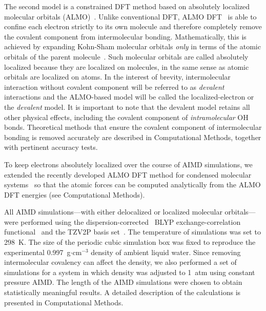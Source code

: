 \documentclass[journal=jacsat,manuscript=article]{achemso}
\begin{document}
The second model is a constrained DFT method based on absolutely localized molecular orbitals (ALMO)~\cite{khaliullin2006efficient}. 
Unlike conventional DFT, ALMO DFT~\cite{Khaliullin2013JCTC} is able to confine each electron strictly to its own molecule and therefore completely remove the covalent component from intermolecular bonding. 
Mathematically, this is achieved by expanding Kohn-Sham molecular orbitals \emph{only} in terms of the atomic orbitals of the parent molecule~\cite{stoll1980use,khaliullin2006efficient, mo2000energy}.
Such molecular orbitals are called absolutely localized because they are localized on molecules, in the same sense as atomic orbitals are localized on atoms. 
In the interest of brevity, intermolecular interaction without covalent component will be referred to as \emph{devalent} interactions and the ALMO-based model will be called the localized-electron or the \emph{devalent} model. 
It is important to note that the devalent model retains all other physical effects, including the covalent component of \emph{intramolecular} OH bonds. %
Theoretical methods that ensure the covalent component of intermolecular bonding is removed accurately are described in Computational Methods, together with pertinent accuracy tests.

To keep electrons absolutely localized over the course of AIMD simulations, we extended the recently developed ALMO DFT method for condensed molecular systems~\cite{Khaliullin2013JCTC} so that the atomic forces can be computed analytically from the ALMO DFT energies (see Computational Methods).

All AIMD simulations---with either delocalized or localized molecular orbitals---were performed using the dispersion-corrected~\cite{grimme2010consistent} BLYP exchange-correlation functional~\cite{becke1988density, lee1988development} and the TZV2P basis set~\cite{vandevondele2007gaussian}. 
The temperature of simulations was set to 298~K. 
The size of the periodic cubic simulation box was fixed to reproduce the experimental 0.997~g$\cdot$cm$^{-3}$ density of ambient liquid water. 
Since removing intermolecular covalency can affect the density, we also performed a set of simulations for a system in which density was adjusted to 1~atm using constant pressure AIMD. 
The length of the AIMD simulations were chosen to obtain statistically meaningful results. 
A detailed description of the calculations is presented in Computational Methods.
\end{document}
